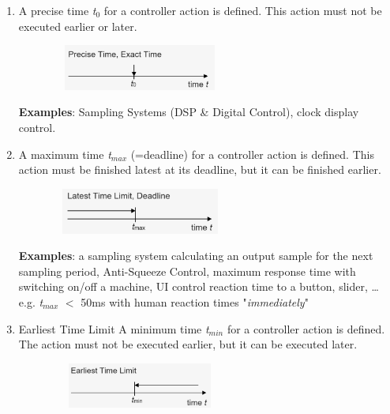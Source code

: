\begin{enumerate}
\item  A precise time \textit{t}${}_{0}$ for a controller action is defined. This action must not be executed earlier or later.
	
	\begin{figure}[h]
    \centering
    \includegraphics[width=6cm, height=1.5cm]{Images/image62.png}
    \label{fig:Fig }
	\end{figure} 

\textbf{Examples}: Sampling Systems (DSP \& Digital Control),      clock display control.

\item  A maximum time \textit{t}${}_{max}$ (=deadline) for a controller action is defined. This action must be finished latest at its deadline, but it can be finished earlier. 

	\begin{figure}[h]
    \centering
    \includegraphics[width=6cm, height=1.5cm]{Images/image63.png}
    \label{fig:Fig }
    \end{figure}
    
\textbf{Examples}: a sampling system calculating an output sample for the next sampling      period, Anti-Squeeze Control, maximum response time with switching      on/off a machine, UI control reaction time to a button, slider, {\dots}      e.g. \textit{t${}_{max}$} $\mathrm{<}$ 50ms with human reaction times  "\textit{immediately}"    

\item  Earliest Time Limit A minimum time \textit{t}${}_{min}$ for a controller action is defined. The action must not be executed earlier, but it can be executed later. 
	
	\begin{figure}[h]
    \centering
    \includegraphics[width=6cm, height=1.5cm]{Images/image64.png}
    \label{fig:Fig }
    \end{figure}
    

\end{enumerate}
